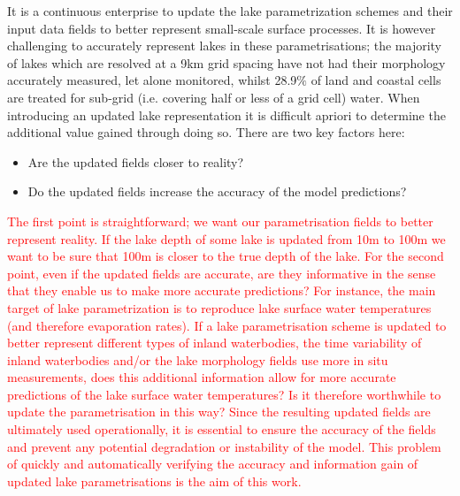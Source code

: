 \documentclass[hess, twostagejnl]{copernicus}
\begin{document}
\noindent It is a continuous enterprise to update the lake parametrization schemes and their input data fields to better represent small-scale surface processes. It is however challenging to accurately represent lakes in these parametrisations; the majority of lakes which are resolved at a 9km grid spacing have not had their morphology accurately measured, let alone monitored, whilst 28.9$\%$ of land and coastal cells are treated for sub-grid (i.e. covering half or less of a grid cell) water. When introducing an updated lake representation it is difficult apriori to determine the additional value gained through doing so. There are two key factors here:
\begin{itemize}
	\item Are the updated fields closer to reality?
	\item Do the updated fields increase the accuracy of the model predictions?
\end{itemize}
\textcolor{red}{The first point is straightforward; we want our parametrisation fields to better represent reality. If the lake depth of some lake is updated from 10m to 100m we want to be sure that 100m is closer to the true depth of the lake. For the second point, even if the updated fields are accurate, are they informative in the sense that they enable us to make more accurate predictions? For instance, the main target of lake parametrization is to reproduce lake surface water temperatures (and therefore evaporation rates). If a lake parametrisation scheme is updated to better represent different types of inland waterbodies, the time variability of inland waterbodies and/or the lake morphology fields use more in situ measurements, does this additional information allow for more accurate predictions of the lake surface water temperatures? Is it therefore worthwhile to update the parametrisation in this way? Since the resulting updated fields are ultimately used operationally, it is essential to ensure the accuracy of the fields and prevent any potential degradation or instability of the model. This problem of quickly and automatically verifying the accuracy and information gain of updated lake parametrisations is the aim of this work.} \newline
\end{document}
